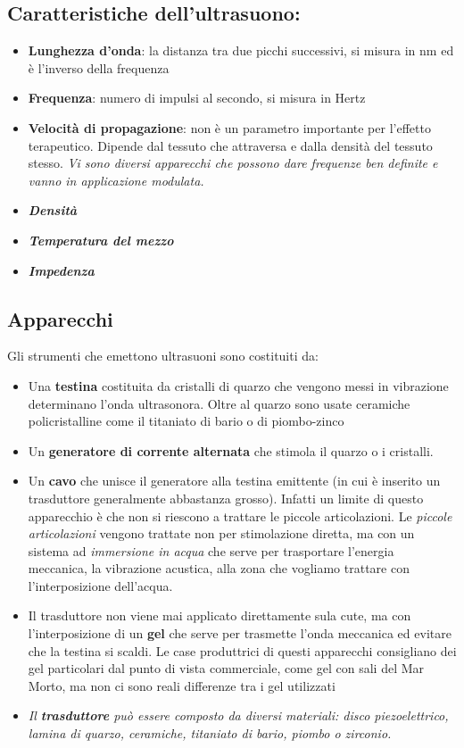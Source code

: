 \subsection{Caratteristiche dell'ultrasuono:}

\begin{itemize}
\item
  \textbf{Lunghezza d'onda}: la distanza tra due picchi successivi, si
  misura in nm ed è l'inverso della frequenza
\item
  \textbf{Frequenza}: numero di impulsi al secondo, si misura in Hertz
\item
  \textbf{Velocità di propagazione}: non è un parametro importante per
  l'effetto terapeutico. Dipende dal tessuto che attraversa e dalla
  densità del tessuto stesso. \emph{Vi sono diversi apparecchi che
  possono dare frequenze ben definite e vanno in applicazione modulata.}
\item
  \emph{\textbf{Densità}}
\item
  \emph{\textbf{Temperatura del mezzo}}
\item
  \emph{\textbf{Impedenza}}
\end{itemize}

\subsection{Apparecchi }

Gli strumenti che emettono ultrasuoni sono costituiti da:

\begin{itemize}
\item
  Una \textbf{testina} costituita da cristalli di quarzo che vengono
  messi in vibrazione determinano l'onda ultrasonora. Oltre al quarzo
  sono usate ceramiche policristalline come il titaniato di bario o di
  piombo-zinco
\item
  Un \textbf{generatore di corrente alternata} che stimola il quarzo o i
  cristalli.
\item
  Un \textbf{cavo} che unisce il generatore alla testina emittente (in
  cui è inserito un trasduttore generalmente abbastanza grosso). Infatti
  un limite di questo apparecchio è che non si riescono a trattare le
  piccole articolazioni. Le \emph{piccole articolazioni} vengono
  trattate non per stimolazione diretta, ma con un sistema ad
  \emph{immersione in acqua} che serve per trasportare l'energia
  meccanica, la vibrazione acustica, alla zona che vogliamo trattare con
  l'interposizione dell'acqua.
\item
  Il trasduttore non viene mai applicato direttamente sula cute, ma con
  l'interposizione di un \textbf{gel} che serve per trasmette l'onda
  meccanica ed evitare che la testina si scaldi. Le case produttrici di
  questi apparecchi consigliano dei gel particolari dal punto di vista
  commerciale, come gel con sali del Mar Morto, ma non ci sono reali
  differenze tra i gel utilizzati
\item
  \emph{Il \textbf{trasduttore} può essere composto da diversi
  materiali: disco piezoelettrico, lamina di quarzo, ceramiche,
  titaniato di bario, piombo o zirconio.}
\end{itemize}

